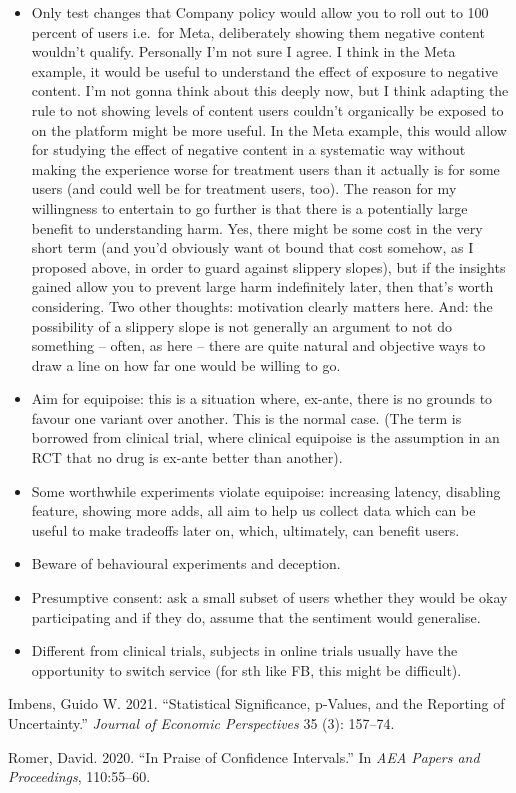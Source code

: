 \documentclass[
  letterpaper,
  DIV=11,
  numbers=noendperiod]{scrreprt}
\newlength{\cslhangindent}
\newlength{\cslentryspacingunit} %
\newenvironment{CSLReferences}[2] %
 {%
  \setlength{\parindent}{0pt}
  \ifodd #1
  \let\oldpar\par
  \def\par{\hangindent=\cslhangindent\oldpar}
  \fi
  \setlength{\parskip}{#2\cslentryspacingunit}
 }%
 {}
\begin{document}
\begin{itemize}
\item
  Only test changes that Company policy would allow you to roll out to
  100 percent of users i.e.~for Meta, deliberately showing them negative
  content wouldn't qualify. Personally I'm not sure I agree. I think in
  the Meta example, it would be useful to understand the effect of
  exposure to negative content. I'm not gonna think about this deeply
  now, but I think adapting the rule to not showing levels of content
  users couldn't organically be exposed to on the platform might be more
  useful. In the Meta example, this would allow for studying the effect
  of negative content in a systematic way without making the experience
  worse for treatment users than it actually is for some users (and
  could well be for treatment users, too). The reason for my willingness
  to entertain to go further is that there is a potentially large
  benefit to understanding harm. Yes, there might be some cost in the
  very short term (and you'd obviously want ot bound that cost somehow,
  as I proposed above, in order to guard against slippery slopes), but
  if the insights gained allow you to prevent large harm indefinitely
  later, then that's worth considering. Two other thoughts: motivation
  clearly matters here. And: the possibility of a slippery slope is not
  generally an argument to not do something -- often, as here -- there
  are quite natural and objective ways to draw a line on how far one
  would be willing to go.
\item
  Aim for equipoise: this is a situation where, ex-ante, there is no
  grounds to favour one variant over another. This is the normal case.
  (The term is borrowed from clinical trial, where clinical equipoise is
  the assumption in an RCT that no drug is ex-ante better than another).
\item
  Some worthwhile experiments violate equipoise: increasing latency,
  disabling feature, showing more adds, all aim to help us collect data
  which can be useful to make tradeoffs later on, which, ultimately, can
  benefit users.
\item
  Beware of behavioural experiments and deception.
\item
  Presumptive consent: ask a small subset of users whether they would be
  okay participating and if they do, assume that the sentiment would
  generalise.
\item
  Different from clinical trials, subjects in online trials usually have
  the opportunity to switch service (for sth like FB, this might be
  difficult).
\end{itemize}

\hypertarget{refs}{}
\begin{CSLReferences}{1}{0}
\leavevmode{}%
Imbens, Guido W. 2021. {``Statistical Significance, p-Values, and the
Reporting of Uncertainty.''} \emph{Journal of Economic Perspectives} 35
(3): 157--74.

\leavevmode{}%
Romer, David. 2020. {``In Praise of Confidence Intervals.''} In
\emph{AEA Papers and Proceedings}, 110:55--60.

\end{CSLReferences}
\end{document}

